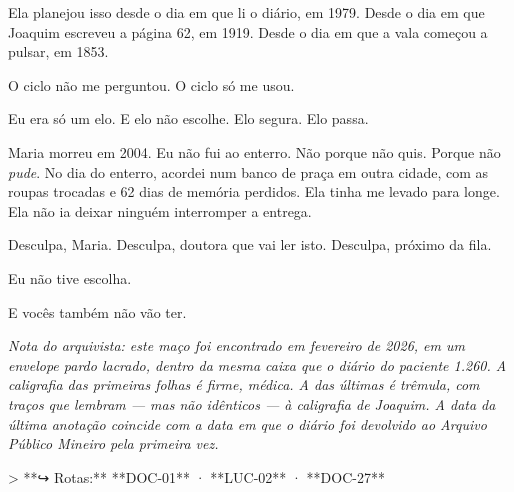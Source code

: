 \noindent Ela planejou isso desde o dia em que li o diário, em 1979. Desde o dia em que Joaquim escreveu a página 62, em 1919. Desde o dia em que a vala começou a pulsar, em 1853.

\noindent O ciclo não me perguntou. O ciclo só me usou.

\noindent Eu era só um elo. E elo não escolhe. Elo segura. Elo passa.

\noindent Maria morreu em 2004. Eu não fui ao enterro. Não porque não quis. Porque não \textit{pude}. No dia do enterro, acordei num banco de praça em outra cidade, com as roupas trocadas e 62 dias de memória perdidos. Ela tinha me levado para longe. Ela não ia deixar ninguém interromper a entrega.

\noindent Desculpa, Maria. Desculpa, doutora que vai ler isto. Desculpa, próximo da fila.

\noindent Eu não tive escolha.

\noindent E vocês também não vão ter.

\vspace{0.5em}
\noindent \textit{Nota do arquivista: este maço foi encontrado em fevereiro de 2026, em um envelope pardo lacrado, dentro da mesma caixa que o diário do paciente 1.260. A caligrafia das primeiras folhas é firme, médica. A das últimas é trêmula, com traços que lembram --- mas não idênticos --- à caligrafia de Joaquim. A data da última anotação coincide com a data em que o diário foi devolvido ao Arquivo Público Mineiro pela primeira vez.}

> **↪ Rotas:** **DOC-01** · **LUC-02** · **DOC-27**
